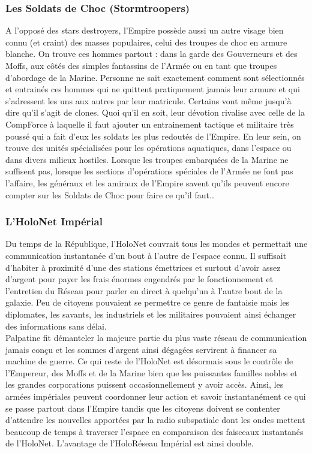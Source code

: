 \documentclass[twoside]{article}
\begin{document}
\subsubsection{Les Soldats de Choc (Stormtroopers)}
A l'opposé des stars destroyers, l'Empire possède aussi un autre visage bien connu (et craint) des masses populaires, celui des troupes de choc en armure blanche. On trouve ces hommes partout : dans la garde des Gouverneurs et des Moffs, aux côtés des simples fantassins de l'Armée ou en tant que troupes d'abordage de la Marine. Personne ne sait exactement comment sont sélectionnés et entrainés ces hommes qui ne quittent pratiquement jamais leur armure et qui s'adressent les uns aux autres par leur matricule. Certains vont même jusqu'à dire qu'il s'agit de clones. Quoi qu'il en soit, leur dévotion rivalise avec celle de la CompForce à laquelle il faut ajouter un entrainement tactique et militaire très poussé qui a fait d'eux les soldats les plus redoutés de l'Empire. En leur sein, on trouve des unités spécialisées pour les opérations aquatiques, dans l'espace ou dans divers milieux hostiles. Lorsque les troupes embarquées de la Marine ne suffisent pas, lorsque les sections d'opérations spéciales de l'Armée ne font pas l'affaire, les généraux et les amiraux de l'Empire savent qu'ils peuvent encore compter sur les Soldats de Choc pour faire ce qu'il faut\ldots

\subsubsection{L'HoloNet Impérial}
Du temps de la République, l'HoloNet couvrait tous les mondes et permettait une communication instantanée d'un bout à l'autre de l'espace connu. Il suffisait d'habiter à proximité d'une des stations émettrices et surtout d'avoir assez d'argent pour payer les frais énormes engendrés par le fonctionnement et l'entretien du Réseau pour parler en direct à quelqu'un à l'autre bout de la galaxie. Peu de citoyens pouvaient se permettre ce genre de fantaisie mais les diplomates, les savants, les industriels et les militaires pouvaient ainsi échanger des informations sans délai.\\

Palpatine fit démanteler la majeure partie du plus vaste réseau de communication jamais conçu et les sommes d'argent ainsi dégagées servirent à financer sa machine de guerre. Ce qui reste de l’HoloNet est désormais sous le contrôle de l'Empereur, des Moffs et de la Marine bien que les puissantes familles nobles et les grandes corporations puissent occasionnellement y avoir accès. Ainsi, les armées impériales peuvent coordonner leur action et savoir instantanément ce qui se passe partout dans l'Empire tandis que les citoyens doivent se contenter d'attendre les nouvelles apportées par la radio subspatiale dont les ondes mettent beaucoup de temps à traverser l'espace en comparaison des faisceaux instantanés de l'HoloNet. L'avantage de l’HoloRéseau Impérial est ainsi double. \\
\end{document}
